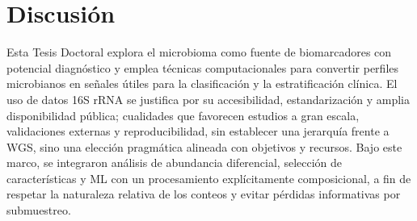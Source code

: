 

\chapter{Discusión}
\label{chap:discussion}




Esta Tesis Doctoral explora el microbioma como fuente de biomarcadores con potencial diagnóstico y emplea técnicas computacionales para convertir perfiles microbianos en señales útiles para la clasificación y la estratificación clínica. El uso de datos 16S rRNA se justifica por su accesibilidad, estandarización y amplia disponibilidad pública; cualidades que favorecen estudios a gran escala, validaciones externas y reproducibilidad, sin establecer una jerarquía frente a WGS, sino una elección pragmática alineada con objetivos y recursos. Bajo este marco, se integraron análisis de abundancia diferencial, selección de características y ML con un procesamiento explícitamente composicional, a fin de respetar la naturaleza relativa de los conteos y evitar pérdidas informativas por submuestreo.



